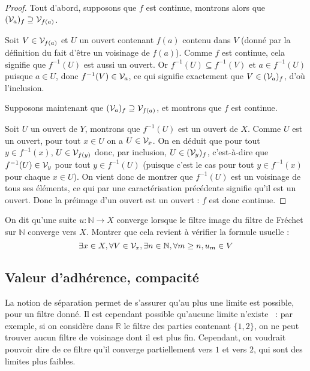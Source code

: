 \begin{proof}
  Tout d'abord, supposons que $f$ est continue, montrons alors que
  $(\mathcal{V}_a)_f \supseteq \mathcal{V}_{f(a)}$.

  Soit $V\in\mathcal{V}_{f(a)}$ et $U$ un ouvert contenant $f(a)$ contenu dans $V$
  (donné par la définition du fait d'être un voisinage de $f(a)$).
  Comme $f$ est continue, cela signifie que $f^{-1}(U)$ est aussi un ouvert. Or
  $f^{-1}(U)\subseteq f^{-1}(V)$ et $a\in f^{-1}(U)$ puisque $a\in U$, donc
  $f^{-1}(V)\in\mathcal{V}_a$, ce qui signifie exactement que $V\in(\mathcal{V}_a)_f$, d'où
  l'inclusion.

  Supposons maintenant que $(\mathcal{V}_a)_f\supseteq \mathcal{V}_{f(a)}$, et montrons que
  $f$ est continue.

  Soit $U$ un ouvert de $Y$, montrons que $f^{-1}(U)$ est un ouvert de $X$.
  Comme $U$ est un ouvert, pour tout $x\in U$ on a $U\in\mathcal{V}_x$. On en
  déduit que pour tout $y\in f^{-1}(x)$, $U\in\mathcal{V}_{f(y)}$ donc, par inclusion,
  $U\in(\mathcal{V}_y)_f$, c'est-à-dire que $f^{-1}(U)\in\mathcal{V}_y$ pour tout
  $y\in f^{-1}(U)$ (puisque c'est le cas pour tout $y\in f^{-1}(x)$ pour chaque
  $x\in U$). On vient donc de montrer que $f^{-1}(U)$ est un voisinage de tous
  ses éléments, ce qui par une caractérisation précédente signifie qu'il est un
  ouvert. Donc la préimage d'un ouvert est un ouvert : $f$ est donc continue.
\end{proof}

\begin{exercise}\label{exo.conv.suite}
  On dit qu'une suite $u : \mathbb N \to X$ converge lorsque le filtre image du
  filtre de Fréchet sur $\mathbb N$ converge vers $X$. Montrer que cela revient
  à vérifier la formule usuelle :
  \[\exists x\in X,\forall V\in\mathcal{V}_x, \exists n \in \mathbb N,
  \forall m \geq n, u_m \in V\]
\end{exercise}

\subsection{Valeur d'adhérence, compacité}

La notion de séparation permet de s'assurer qu'au plus une limite est possible,
pour un filtre donné. Il est cependant possible qu'aucune limite n'existe~ : par
exemple, si on considère dans $\mathbb R$ le filtre des parties contenant
$\{1,2\}$, on ne peut trouver aucun filtre de voisinage dont il est plus fin.
Cependant, on voudrait pouvoir dire de ce filtre qu'il converge partiellement
vers $1$ et vers $2$, qui sont des limites plus faibles.


